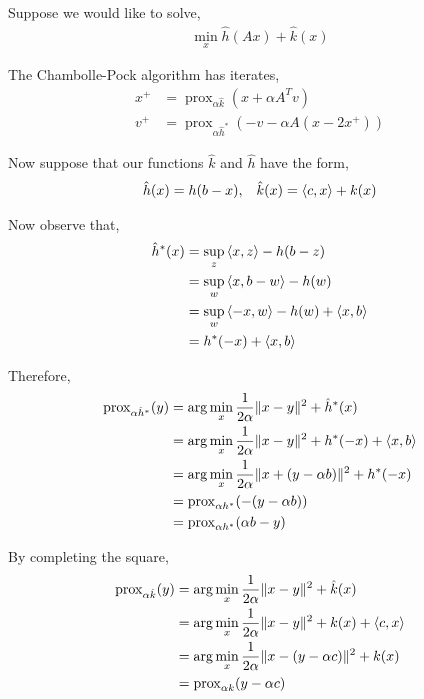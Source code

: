 \documentclass[10pt]{article}
\begin{document}
\begin{solution}[Solution]
Suppose we would like to solve,
\begin{align*}
    \min_x \hat{h}(Ax) + \hat{k}(x)
\end{align*}

The Chambolle-Pock algorithm has iterates,
\begin{align*}
    x^+ &= \operatorname{prox}_{\alpha \hat{k}}(x+\alpha A^Tv) \\
    v^+ &= \operatorname{prox}_{\alpha \hat{h}^*}(-v-\alpha A(x-2x^+))
\end{align*}

Now suppose that our functions \( \hat{k} \) and \( \hat{h} \) have the form,
\begin{align*}
    \hat{h}(x) = h(b-x)
    ,&& 
    \hat{k}(x) = \left\langle c,x \right\rangle + k(x)
\end{align*}

Now observe that,
\begin{align*}
    \hat{h}^*(x) &= \sup_z \left\langle x,z \right\rangle - h(b-z)
    \\&= \sup_w \left\langle x,b-w \right\rangle - h(w)
    \\&= \sup_w \left\langle -x,w \right\rangle - h(w) + \left\langle x,b \right\rangle
    \\&= h^*(-x) + \left\langle x,b \right\rangle
\end{align*}

Therefore,
\begin{align*}
    \operatorname{prox}_{\alpha \hat{h}^*}(y) &= \arg\min_{x} \frac{1}{2 \alpha} \| x-y \|^2 + \hat{h}^*(x)
    \\&= \arg\min_{x} \frac{1}{2 \alpha} \| x-y \|^2 + h^*(-x) + \left\langle x,b \right\rangle
    \\&= \arg\min_{x} \frac{1}{2 \alpha} \| x + (y-\alpha b) \|^2 + h^*(-x)
    \\&= \operatorname{prox}_{\alpha h^*}(-(y-\alpha b))
    \\&= \operatorname{prox}_{\alpha h^*}(\alpha b-y)
\end{align*}

By completing the square,
\begin{align*}
    \operatorname{prox}_{\alpha \hat{k}}(y) &= \arg\min_x \frac{1}{2 \alpha}\| x-y \|^2 + \hat{k}(x) 
    \\&= \arg\min_x \frac{1}{2 \alpha} \| x-y \|^2 + k(x) + \left\langle c,x \right\rangle
    \\&= \arg\min_x \frac{1}{2 \alpha} \| x-(y-\alpha c) \|^2 + k(x)
    \\&= \operatorname{prox}_{\alpha k}(y-\alpha c)
\end{align*}


\end{solution}
\end{document}
